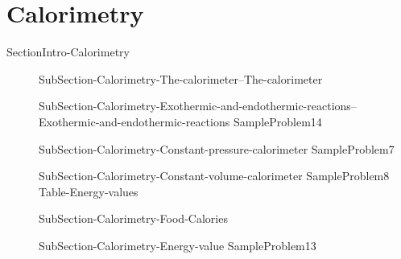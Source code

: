 \documentclass[main.tex]{subfiles}
\newcommand\chapterlabel{Ch-thermochemistry}\setcounter{figurenewcounter}{0}\setcounter{tablenewcounter}{0}\setcounter{formulanewcounter}{0}
\begin{document}
\section{Calorimetry}
{SectionIntro-Calorimetry}
\sloppy\begin{description}
\item[] {SubSection-Calorimetry-The-calorimeter--The-calorimeter}
\item[]  {SubSection-Calorimetry-Exothermic-and-endothermic-reactions--Exothermic-and-endothermic-reactions}%
{SampleProblem14}%
\item[] {SubSection-Calorimetry-Constant-pressure-calorimeter}%
{SampleProblem7}%
\item[]  {SubSection-Calorimetry-Constant-volume-calorimeter}%
{SampleProblem8}%
\hspace{-2cm}{Figure-Calorimeter}%
{Table-Energy-values}
\item[]  {SubSection-Calorimetry-Food-Calories}
\item[]  {SubSection-Calorimetry-Energy-value}
{SampleProblem13}
\end{description}
     
     
     
\end{document}
